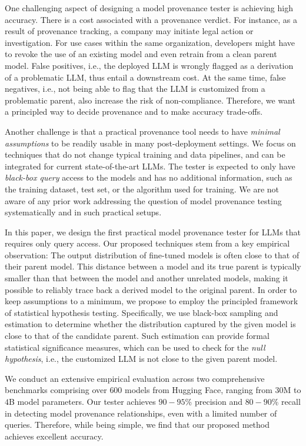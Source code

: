 %
One challenging aspect of designing a model provenance tester is achieving high accuracy. There is a cost associated with a provenance verdict. For instance, as a result of provenance tracking, a company may initiate legal action or investigation. For use cases within the same organization, developers might have to revoke the use of an existing model and even retrain from a clean parent model. False positives, i.e., the deployed LLM is wrongly flagged as a derivation of a problematic LLM, thus entail a downstream cost. At the same time, false negatives, i.e., not being able to flag that the LLM is customized from a problematic parent, also increase the risk of non-compliance. Therefore, we want a principled way to decide provenance and to make accuracy trade-offs.

%
%
Another challenge is that a practical provenance tool needs to have {\em minimal assumptions} to be readily usable in many post-deployment settings. We focus on techniques that do not change typical training and data pipelines, and can be integrated for current state-of-the-art LLMs. The tester is expected to only have {\em black-box query} access to the models and has no additional information, such as the training dataset, test set, or the algorithm used for training. We are not aware of any prior work addressing the question of model provenance testing systematically and in such practical setups.


In this paper, we design the first practical model provenance tester for 
LLMs that requires only query access.
Our proposed techniques stem from a key empirical observation: The output distribution of fine-tuned models is often close to that of their parent model. This distance between a model and its true parent is typically smaller than that between the model and another unrelated models, making it possible to reliably trace back a derived model to the original parent. %
In order to keep assumptions to a minimum, we propose to employ the principled framework of statistical hypothesis testing. 
Specifically, we use black-box sampling and estimation to determine whether the distribution captured by the given model is close to that of the candidate parent. Such estimation can provide formal statistical significance measures, which can be used to check for the {\em null hypothesis}, i.e., the customized LLM is not 
close to the given parent model.
%

We conduct an extensive empirical evaluation across two comprehensive benchmarks comprising over $600$ models from Hugging Face, ranging from $30$M to $4$B model parameters. Our tester achieves $90-95$\% precision and $80-90$\% recall in detecting model provenance relationships, even with a limited number of queries. Therefore, while being simple, we find that our proposed method achieves excellent accuracy.  

